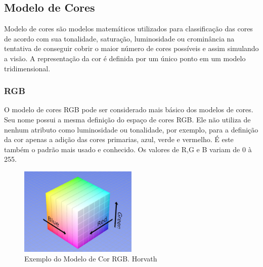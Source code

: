 \subsection{Modelo de Cores}
Modelo de cores são modelos matemáticos utilizados para classificação das cores de acordo com sua tonalidade, saturação, luminosidade ou crominância na tentativa de conseguir cobrir o maior número de cores possíveis e assim simulando a visão. A representação da cor é definida por um único ponto em um modelo tridimensional. 
\subsubsection{RGB}
O modelo de cores RGB pode ser considerado mais básico dos modelos de cores. Seu nome possui a mesma definição do espaço de cores RGB. Ele não utiliza de nenhum atributo como luminosidade ou tonalidade, por exemplo, para a definição da cor apenas a adição das cores primarias, azul, verde e vermelho. É este também o padrão mais usado e conhecido. Os valores de R,G e B variam de 0 à 255.
\begin{figure}[!h]
	\centering
	\includegraphics[width=0.5\textwidth]{rgb.pdf}
	
	\caption{Exemplo do Modelo de Cor RGB.	 Horvath\cite{ImagensHSLHSVRGB}  }
	\label{ModeloRGB}
\end{figure}
